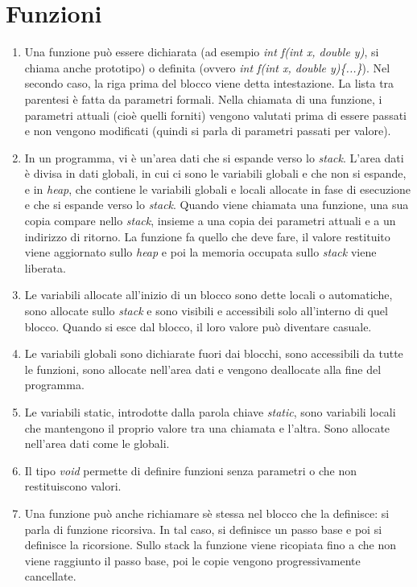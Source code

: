 \documentclass[a4paper,11pt]{article}
\begin{document}
\section{Funzioni}
\begin{enumerate}[resume]
	\item Una funzione può essere dichiarata (ad esempio \textit{int f(int x, double y)}, si chiama anche prototipo) o definita (ovvero \textit{int f(int x, double y)\{...\}}). Nel secondo caso, la riga prima del blocco viene detta intestazione. La lista tra parentesi è fatta da parametri formali. Nella chiamata di una funzione, i parametri attuali (cioè quelli forniti) vengono valutati prima di essere passati e non vengono modificati (quindi si parla di parametri passati per valore).
	\item In un programma, vi è un'area dati che si espande verso lo \textit{stack}. L'area dati è divisa in dati globali, in cui ci sono le variabili globali e che non si espande, e in \textit{heap}, che contiene le variabili globali e locali allocate in fase di esecuzione e che si espande verso lo \textit{stack}.  Quando viene chiamata una funzione, una sua copia compare nello \textit{stack}, insieme a una copia dei parametri attuali e a un indirizzo di ritorno. La funzione fa quello che deve fare, il valore restituito viene aggiornato sullo \textit{heap} e poi la memoria occupata sullo \textit{stack} viene liberata.
	\item Le variabili allocate all'inizio di un blocco sono dette locali o automatiche, sono allocate sullo \textit{stack} e sono visibili e accessibili solo all'interno di quel blocco. Quando si esce dal blocco, il loro valore può diventare casuale.
	\item Le variabili globali sono dichiarate fuori dai blocchi, sono accessibili da tutte le funzioni, sono allocate nell'area dati e vengono deallocate alla fine del programma.
	\item Le variabili static, introdotte dalla parola chiave \textit{static}, sono variabili locali che mantengono il proprio valore tra una chiamata e l'altra. Sono allocate nell'area dati come le globali. 
	\item Il tipo \textit{void} permette di definire funzioni senza parametri o che non restituiscono valori.
	\item Una funzione può anche richiamare sè stessa nel blocco che la definisce: si parla di funzione ricorsiva. In tal caso, si definisce un passo base e poi si definisce la ricorsione. Sullo stack la funzione viene ricopiata fino a che non viene raggiunto il passo base, poi le copie vengono progressivamente cancellate.
\end{enumerate}
\end{document}
